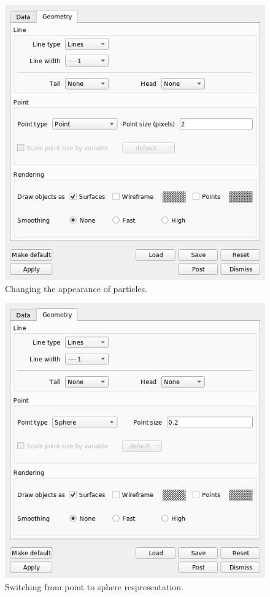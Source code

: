\begin{paracol}{2}
  \begin{figure}[htb!]
    \centering
    \includegraphics[width=\columnwidth]{FIGS/visit/visit_17.png}
    \caption{Changing the appearance of particles.}
    \label{fig:visit_17}
  \end{figure}

  \switchcolumn

  \begin{figure}[htb!]
    \centering
    \includegraphics[width=0.5\columnwidth]{FIGS/visit/visit_20.png}
    \caption{Switching from point to sphere respresentation.}
    \label{fig:visit_20}
  \end{figure}


\end{paracol}
